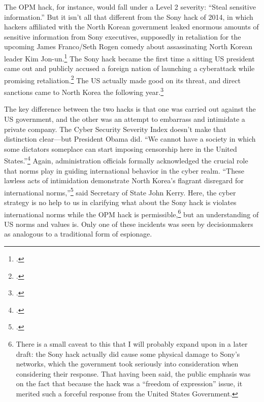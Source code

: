 \documentclass{report}
\begin{document}
\begin{refsegment}
The OPM hack, for instance, would fall under a Level 2 severity: ``Steal sensitive information.'' But it isn't all that different from the Sony hack of 2014, in which hackers affiliated with the North Korean government leaked enormous amounts of sensitive information from Sony executives, supposedly in retaliation for the upcoming James Franco/Seth Rogen comedy about assassinating North Korean leader Kim Jon-un.\footcite{barnes_sony_2017} The Sony hack became the first time a sitting US president came out and publicly accused a foreign nation of launching a cyberattack while promising retaliation.\footcite{sanger_u.s._2017} The US actually made good on its threat, and direct sanctions came to North Korea the following year.\footcite{lederman_us_2015}

The key difference between the two hacks is that one was carried out against the US government, and the other was an attempt to embarrass and intimidate a private company. The Cyber Security Severity Index doesn't make that distinction clear---but President Obama did. ``We cannot have a society in which some dictators someplace can start imposing censorship here in the United States.''\footcite{perez_obama_2014} Again, administration officials formally acknowledged the crucial role that norms play in guiding international behavior in the cyber realm. ``These lawless acts of intimidation demonstrate North Korea's flagrant disregard for international norms,''\footcite{perez_obama_2014} said Secretary of State John Kerry. Here, the cyber strategy is no help to us in clarifying what about the Sony hack is violates international norms while the OPM hack is permissible,\footnote{There is a small caveat to this that I will probably expand upon in a later draft: the Sony hack actually did cause some physical damage to Sony's networks, which the government took seriously into consideration when considering their response. That having been said, the public emphasis was on the fact that because the hack was a ``freedom of expression'' issue, it merited such a forceful response from the United States Government.} but an understanding of US norms and values is. Only one of these incidents was seen by decisionmakers as analogous to a traditional form of espionage.


\end{refsegment}
\end{document}
